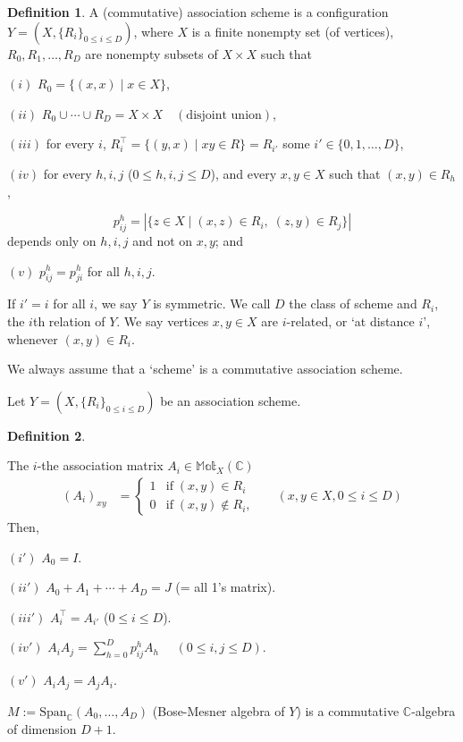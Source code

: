\documentclass[
]{book}
\theoremstyle{definition}
\newtheorem{definition}{Definition}[chapter]
\theoremstyle{definition}
\theoremstyle{definition}
\theoremstyle{definition}
\theoremstyle{remark}
\begin{document}
\begin{definition}
\protect\hypertarget{def:association-scheme}{}\label{def:association-scheme}A (commutative) association scheme is a configuration \(Y = (X, \{R_i\}_{0\leq i\leq D})\), where \(X\) is a finite nonempty set (of vertices),
\(R_0, R_1, \ldots, R_D\) are nonempty subsets of \(X\times X\) such that

\((i)\) \(R_0 = \{(x,x)\mid x\in X\}\),

\((ii)\) \(R_0 \cup \cdots \cup R_D = X\times X \quad (\text{disjoint union})\),

\((iii)\) for every \(i\), \(R_i^\top = \{(y,x)\mid xy\in R\} = R_{i'}\) some \(i'\in \{0,1,\ldots, D\}\),

\((iv)\) for every \(h, i, j\) (\(0\leq h, i, j\leq D\)), and every \(x,y\in X\) such that \((x,y)\in R_h\),

\[p^h_{ij} = |\{z\in X\mid (x,z)\in R_i, \; (z,y)\in R_j\}|\]
depends only on \(h, i, j\) and not on \(x,y\); and

\((v)\) \(p^h_{ij} = p^h_{ji}\) for all \(h,i, j\).

If \(i' = i\) for all \(i\), we say \(Y\) is symmetric.
We call \(D\) the class of scheme and \(R_i\), the \(i\)th relation of \(Y\). We say vertices \(x,y\in X\) are \(i\)-related, or `at distance \(i\)', whenever \((x,y)\in R_i\).

We always assume that a `scheme' is a commutative association scheme.
\end{definition}

Let \(Y = (X, \{R_i\}_{0\leq i\leq D})\) be an association scheme.

\begin{definition}
\protect\hypertarget{def:incidencemat-of-as}{}\label{def:incidencemat-of-as}

The \(i\)-the association matrix \(A_i\in \mathbb{Mat}_X(\mathbb{C})\)
\begin{align}
(A_i)_{xy} & = \begin{cases} 1 & \text{if}\; (x,y)\in R_i\\
0 & \text{if}\; (x,y)\not\in R_i,\end{cases} && (x,y\in X, 0\leq i\leq D)
\end{align}
Then,

\((i')\) \(A_0 = I\).

\((ii')\) \(A_0 + A_1 + \cdots + A_D = J\) (= all 1's matrix).

\((iii')\) \(A_i^\top = A_{i'}\) (\(0\leq i\leq D\)).

\((iv')\) \({\displaystyle A_iA_j = \sum_{h=0}^D p^h_{ij}A_h\quad }\) \((0\leq i,j\leq D)\).

\((v')\) \(A_iA_j = A_jA_i\).

\(M := \mathrm{Span}_{\mathbb{C}}(A_0, \ldots, A_D)\) (Bose-Mesner algebra of \(Y\)) is a commutative \(\mathbb{C}\)-algebra of dimension \(D+1\).

\end{definition}
\end{document}
